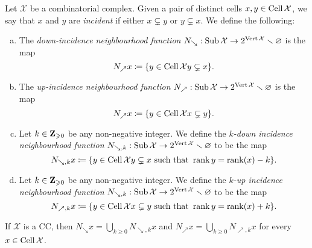 \begin{definition}
    \label{def:down/up-incidence-neighbourhood}
    Let \(\mathcal{X}\) be a combinatorial complex. Given a pair of distinct cells
    \(x, y \in \operatorname{Cell} \mathcal{X}\), we say that \(x\) and \(y\) are \emph{incident} if either
    \(x \subsetneq y\) or \(y \subsetneq x\). We define the following:
    \begin{enumerate}[(a)]\setlength\itemsep{0em}
        \item The \emph{down-incidence neighbourhood function}
              \(N_{\searrow}: \operatorname{Sub} \mathcal{X} \to 2^{\operatorname{Vert} \mathcal{X}} \smallsetminus \varnothing\) is the map
              \[
                  N_{\nearrow} x \coloneq \{y \in \operatorname{Cell} \mathcal{X} \relax y \subsetneq x\}.
              \]

        \item The \emph{up-incidence neighbourhood function}
              \(N_{\nearrow}: \operatorname{Sub} \mathcal{X} \to 2^{\operatorname{Vert} \mathcal{X}} \smallsetminus \varnothing\) is the map
              \[
                  N_{\nearrow} x \coloneq \{y \in \operatorname{Cell} \mathcal{X} \relax x \subsetneq y\}.
              \]

        \item Let \(k \in \mathbf{Z}_{\geqslant 0}\) be any non-negative integer. We define the
              \emph{\(k\)-down incidence neighbourhood function}
              \(N_{\searrow, k}: \operatorname{Sub} \mathcal{X} \to 2^{\operatorname{Vert} \mathcal{X}} \smallsetminus \varnothing\) to be the map
              \[
                  N_{\searrow, k} x \coloneq
                  \{y \in \operatorname{Cell} \mathcal{X} \relax y \subsetneq x \text{ such that } \operatorname{rank} y = \operatorname{rank}(x) - k\}.
              \]

        \item Let \(k \in \mathbf{Z}_{\geqslant 0}\) be any non-negative integer. We define the
              \emph{\(k\)-up incidence neighbourhood function}
              \(N_{\searrow, k}: \operatorname{Sub} \mathcal{X} \to 2^{\operatorname{Vert} \mathcal{X}} \smallsetminus \varnothing\) to be the map
              \[
                  N_{\nearrow, k} x \coloneq
                  \{y \in \operatorname{Cell} \mathcal{X} \relax x \subsetneq y \text{ such that } \operatorname{rank} y = \operatorname{rank}(x) + k\}.
              \]
    \end{enumerate}
\end{definition}

\begin{corollary}
    \label{cor:relation-down/up-to-k-down/up}
    If \(\mathcal{X}\) is a CC, then \(N_{\searrow} x = \bigcup_{k \geq 0} N_{\searrow, k} x\) and \(N_{\nearrow} x = \bigcup_{k \geq
        0} N_{\nearrow, k} x\) for every \(x \in \operatorname{Cell} \mathcal{X}\).
\end{corollary}

